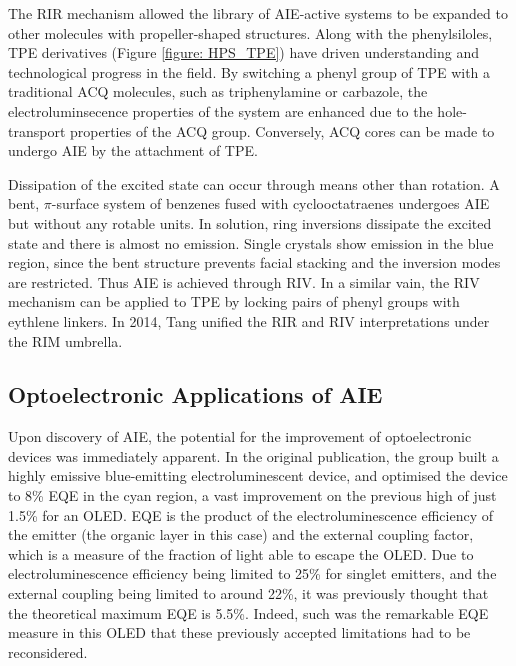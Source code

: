 The \ac{RIR} mechanism allowed the library of \ac{AIE}-active systems to be expanded to other molecules with propeller-shaped structures. Along with the phenylsiloles, \ac{TPE} derivatives (Figure \ref{figure: HPS_TPE}) have driven understanding and technological progress in the field.\cite{Hong2009,Wang2010a,Hong2011,Mei2014,Hu2014,Mei2015} By switching a phenyl group of \ac{TPE} with a traditional \ac{ACQ} molecules, such as triphenylamine or carbazole, the electroluminsecence properties of the system are enhanced due to the hole-transport properties of the \ac{ACQ} group.\cite{Chan2014} Conversely, \ac{ACQ} cores can be made to undergo \ac{AIE} by the attachment of \ac{TPE}.\cite{Yuan2010a}

Dissipation of the excited state can occur through means other than rotation. A bent, $\pi$-surface system of benzenes fused with cyclooctatraenes undergoes \ac{AIE} but without any rotable units.\cite{Nishiuchi2013} In solution, ring inversions dissipate the excited state and there is almost no emission. Single crystals show emission in the blue region, since the bent structure prevents facial stacking and the inversion modes are restricted. Thus \ac{AIE} is achieved through \ac{RIV}. In a similar vain, the \ac{RIV} mechanism can be applied to \ac{TPE} by locking pairs of phenyl groups with eythlene linkers. In 2014, Tang unified the \ac{RIR} and \ac{RIV} interpretations under the \ac{RIM} umbrella.\cite{Leung2014}

\subsection{Optoelectronic Applications of AIE}\label{section: lom AIE_applications}
Upon discovery of \ac{AIE}, the potential for the improvement of optoelectronic devices was immediately apparent. In the original publication, the group built a highly emissive blue-emitting electroluminescent device, and optimised the device to 8\% \ac{EQE} in the cyan region, a vast improvement on the previous high of just 1.5\% for an \ac{OLED}. \cite{Luo2001,Chen2002} \ac{EQE} is the product of the electroluminescence efficiency of the emitter (the organic layer in this case) and the external coupling factor, which is a measure of the fraction of light able to escape the \ac{OLED}. Due to electroluminescence efficiency being limited to 25\% for singlet emitters, and the external coupling being limited to around 22\%, it was previously thought that the theoretical maximum \ac{EQE} is 5.5\%. Indeed, such was the remarkable \ac{EQE} measure in this \ac{OLED} that these previously accepted limitations had to be reconsidered.

